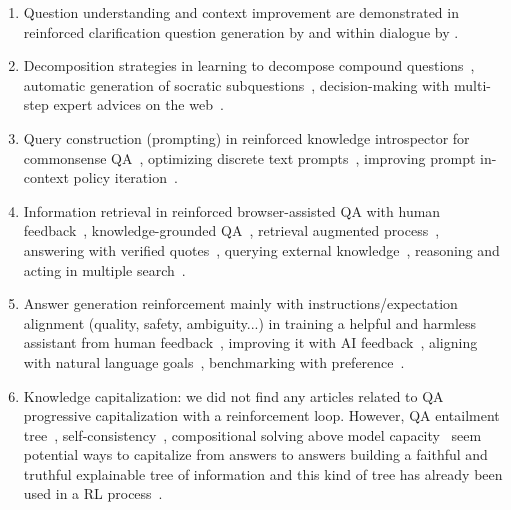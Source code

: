 \documentclass[acmsmall]{acmart}
\begin{document}
\begin{enumerate}
 
   \item {Question understanding and context improvement} are demonstrated in reinforced clarification question generation by \citet{pyatkinReinforcedClarificationQuestion2022} and within dialogue by \citet{huInteractiveQuestionClarification2020}.

  \item {Decomposition strategies} in learning to decompose compound questions~\citep{yangLearningDecomposeCompound2018}, automatic generation of socratic subquestions~\citep{shridharAutomaticGenerationSocratic2022}, decision-making with multi-step expert advices on the web~\citep{philippDecisionMakingMultiStepExpert2019}.
     
   \item {Query construction (prompting)} in reinforced knowledge introspector for commonsense QA~\citep{liuRainierReinforcedKnowledge2022}, optimizing discrete text prompts~\citep{dengRLPromptOptimizingDiscrete2022}, improving prompt in-context policy iteration~\citep{brooksInContextPolicyIteration2022}.
            
   \item {Information retrieval} in reinforced browser-assisted QA with human feedback~\citep{nakanoWebGPTBrowserassistedQuestionanswering2022}, knowledge-grounded QA~\citep{chiuKnowledgeGroundedReinforcementLearning2022}, retrieval augmented process~\citep{goyalRetrievalAugmentedReinforcementLearning2022}, answering with verified quotes~\citep{menickTeachingLanguageModels2022}, querying external knowledge~\citep{liuAskingKnowledgeTraining2022}, reasoning and acting in multiple search~\citep{yaoReActSynergizingReasoning2022}.

   \item {Answer generation} reinforcement mainly with instructions/expectation alignment (quality, safety, ambiguity...) in training a helpful and harmless assistant from human feedback~\citep{baiTrainingHelpfulHarmless2022}, improving it with AI feedback~\citep{baiConstitutionalAIHarmlessness2022}, aligning with natural language goals~\citep{zhouInverseReinforcementLearning2020}, benchmarking with preference~\citep{leeBPrefBenchmarkingPreferenceBased2021}.

   \item {Knowledge capitalization}: we did not find any articles related to QA progressive capitalization with a reinforcement loop. However, QA entailment tree~\citep{ribeiroEntailmentTreeExplanations2022, tafjordEntailerAnsweringQuestions2022, liuRLETReinforcementLearning2022}, self-consistency~\citep{huangLargeLanguageModels2022}, compositional solving above model capacity~\citep{drozdovCompositionalSemanticParsing2022, shaoCompositionalTaskRepresentations2023} seem potential ways to capitalize from answers to answers building a faithful and truthful explainable tree of information and this kind of tree has already been used in a RL process~\citep{liuRLETReinforcementLearning2022}.

\end{enumerate}
\end{document}

